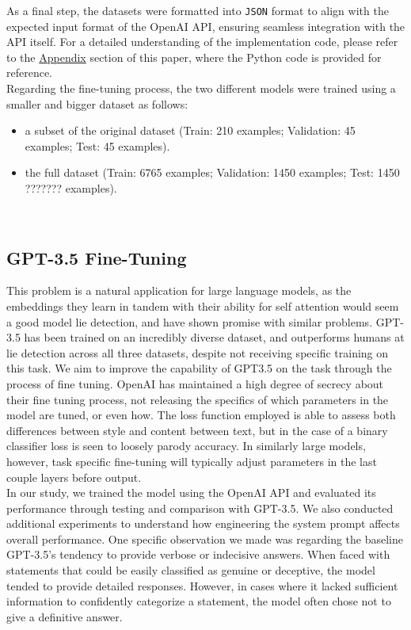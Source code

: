 \documentclass[10pt,twocolumn,letterpaper]{article}
\begin{document}
As a final step, the datasets were formatted into \texttt{JSON} format to align with the expected input format of the OpenAI API, ensuring seamless integration with the API itself. 
For a detailed understanding of the implementation code, please refer to the \hyperref[sec:appendix]{Appendix} section of this paper, where the Python code is provided for reference.\\

Regarding the fine-tuning process, the two different models were trained using a smaller and bigger dataset as follows:

\begin{itemize}
    \item a subset of the original dataset (Train: 210 examples; Validation: 45 examples; Test: 45 examples).
    \item the full dataset (Train: 6765 examples; Validation: 1450 examples; Test: 1450 ??????? examples).
\end{itemize} \\

\subsection{GPT-3.5 Fine-Tuning}

This problem is a natural application for large language models, as the embeddings they learn in tandem
with their ability for self attention would seem a good model lie detection, and have shown promise with
similar problems. GPT-3.5 has been trained on an incredibly diverse dataset, and outperforms humans at lie
detection across all three datasets, despite not receiving specific training on this task. We aim to improve the
capability of GPT3.5 on the task through the process of fine tuning. OpenAI has maintained a high degree of
secrecy about their fine tuning process, not releasing the specifics of which parameters in the model
are tuned, or even how. The loss function employed is able to assess both differences between style and 
content between text, but in the case of a binary classifier loss is seen to loosely parody accuracy. 
In similarly large models, however, task specific fine-tuning will typically adjust parameters in the 
last couple layers before output. \\

In our study, we trained the model using the OpenAI API and evaluated its performance through testing 
and comparison with GPT-3.5. We also conducted additional experiments to understand how engineering 
the system prompt affects overall performance. One specific observation we made was regarding the baseline 
GPT-3.5's tendency to provide verbose or indecisive answers. When faced with statements that could be easily 
classified as genuine or deceptive, the model tended to provide detailed responses. However, in cases where 
it lacked sufficient information to confidently categorize a statement, the model often chose not to give a 
definitive answer.
\end{document}
